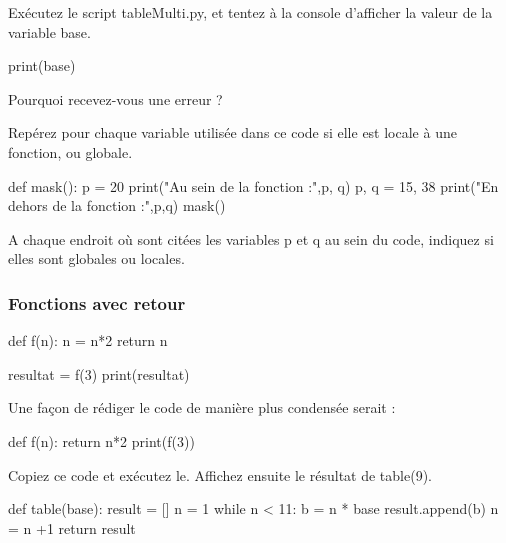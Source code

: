  Exécutez le script tableMulti.py, et tentez à la console d'afficher la valeur de la variable base.

\begin{python}
print(base)
\end{python}

Pourquoi recevez-vous une erreur ?

Repérez pour chaque variable utilisée dans ce code si elle est locale à une fonction, ou globale.


\begin{python}
def mask():
  p = 20
  print("Au sein de la fonction :",p, q)
  p, q = 15, 38
print("En dehors de la fonction :",p,q)
mask()
\end{python}

A chaque endroit o\`u sont citées les variables p et q au sein du code, indiquez si elles sont globales ou locales.

\subsubsection*{Fonctions avec retour}

\begin{python}
def f(n):
  n = n*2
  return n

resultat = f(3)
print(resultat)
\end{python}

Une fa\c con de rédiger le code de manière plus condensée serait :
\begin{python}
def f(n):
  return n*2
print(f(3))
\end{python}

 Copiez ce code et exécutez le. Affichez ensuite le résultat de table(9).

\begin{python}
def table(base):
  result = []
  n = 1
  while n < 11:
    b = n * base
  result.append(b)
  n = n +1
  return result
\end{python}

